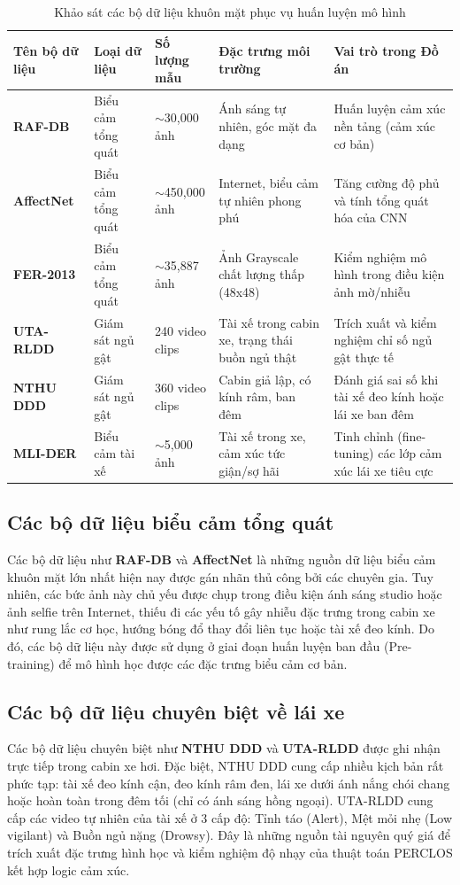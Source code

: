 \documentclass[../DoAn.tex]{subfiles}
\begin{document}
\begin{table}[htbp]
\centering
\caption{Khảo sát các bộ dữ liệu khuôn mặt phục vụ huấn luyện mô hình}
\label{tab:datasets}
\begin{tabular}{|l|l|l|p{3.5cm}|p{4.5cm}|}
\hline
\textbf{Tên bộ dữ liệu} & \textbf{Loại dữ liệu} & \textbf{Số lượng mẫu} & \textbf{Đặc trưng môi trường} & \textbf{Vai trò trong Đồ án} \\ \hline
\textbf{RAF-DB} & Biểu cảm tổng quát & $\sim$30,000 ảnh & Ánh sáng tự nhiên, góc mặt đa dạng & Huấn luyện cảm xúc nền tảng (cảm xúc cơ bản) \\ \hline
\textbf{AffectNet} & Biểu cảm tổng quát & $\sim$450,000 ảnh & Internet, biểu cảm tự nhiên phong phú & Tăng cường độ phủ và tính tổng quát hóa của CNN \\ \hline
\textbf{FER-2013} & Biểu cảm tổng quát & $\sim$35,887 ảnh & Ảnh Grayscale chất lượng thấp (48x48) & Kiểm nghiệm mô hình trong điều kiện ảnh mờ/nhiễu \\ \hline
\textbf{UTA-RLDD} & Giám sát ngủ gật & 240 video clips & Tài xế trong cabin xe, trạng thái buồn ngủ thật & Trích xuất và kiểm nghiệm chỉ số ngủ gật thực tế \\ \hline
\textbf{NTHU DDD} & Giám sát ngủ gật & 360 video clips & Cabin giả lập, có kính râm, ban đêm & Đánh giá sai số khi tài xế đeo kính hoặc lái xe ban đêm \\ \hline
\textbf{MLI-DER} & Biểu cảm tài xế & $\sim$5,000 ảnh & Tài xế trong xe, cảm xúc tức giận/sợ hãi & Tinh chỉnh (fine-tuning) các lớp cảm xúc lái xe tiêu cực \\ \hline
\end{tabular}
\end{table}

\subsection{Các bộ dữ liệu biểu cảm tổng quát}
Các bộ dữ liệu như \textbf{RAF-DB} và \textbf{AffectNet} là những nguồn dữ liệu biểu cảm khuôn mặt lớn nhất hiện nay được gán nhãn thủ công bởi các chuyên gia. Tuy nhiên, các bức ảnh này chủ yếu được chụp trong điều kiện ánh sáng studio hoặc ảnh selfie trên Internet, thiếu đi các yếu tố gây nhiễu đặc trưng trong cabin xe như rung lắc cơ học, hướng bóng đổ thay đổi liên tục hoặc tài xế đeo kính. Do đó, các bộ dữ liệu này được sử dụng ở giai đoạn huấn luyện ban đầu (Pre-training) để mô hình học được các đặc trưng biểu cảm cơ bản.

\subsection{Các bộ dữ liệu chuyên biệt về lái xe}
Các bộ dữ liệu chuyên biệt như \textbf{NTHU DDD} và \textbf{UTA-RLDD} được ghi nhận trực tiếp trong cabin xe hơi. Đặc biệt, NTHU DDD cung cấp nhiều kịch bản rất phức tạp: tài xế đeo kính cận, đeo kính râm đen, lái xe dưới ánh nắng chói chang hoặc hoàn toàn trong đêm tối (chỉ có ánh sáng hồng ngoại). UTA-RLDD cung cấp các video tự nhiên của tài xế ở 3 cấp độ: Tỉnh táo (Alert), Mệt mỏi nhẹ (Low vigilant) và Buồn ngủ nặng (Drowsy). Đây là những nguồn tài nguyên quý giá để trích xuất đặc trưng hình học và kiểm nghiệm độ nhạy của thuật toán PERCLOS kết hợp logic cảm xúc.
\end{document}
